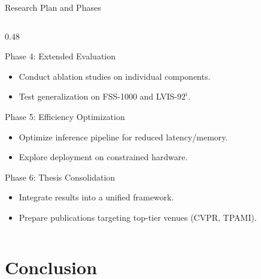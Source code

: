 \documentclass[aspectratio=169, 10pt]{beamer}
\begin{document}
\begin{frame}{Research Plan and Phases}
\begin{columns}[T]
        \begin{column}{0.48\textwidth}
            \begin{block}{Phase 4: Extended Evaluation}
                \scriptsize
                \begin{itemize}
                    \item Conduct ablation studies on individual components.
                    \item Test generalization on FSS-1000 and LVIS-$92^i$.
                \end{itemize}
            \end{block}
            \begin{block}{Phase 5: Efficiency Optimization}
                \scriptsize
                \begin{itemize}
                    \item Optimize inference pipeline for reduced latency/memory.
                    \item Explore deployment on constrained hardware.
                \end{itemize}
            \end{block}
            \begin{block}{Phase 6: Thesis Consolidation}
                \scriptsize
                \begin{itemize}
                    \item Integrate results into a unified framework.
                    \item Prepare publications targeting top-tier venues (CVPR, TPAMI).
                \end{itemize}
            \end{block}
        \end{column}
    \end{columns}
\end{frame}

\section{Conclusion}
\end{document}
